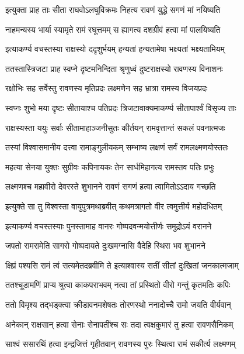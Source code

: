 \twolineshloka
{इत्युक्ता प्राह ताः सीता राघवोऽलघुविक्रमः}
{निहत्य रावणं युद्धे सगणं मां नयिष्यति} %

\twolineshloka
{नाहमन्यस्य भार्या स्यामृते रामं रघूत्तमम्}
{स ह्यागत्य दशग्रीवं हत्वा मां पालयिष्यति} %

\twolineshloka
{इत्याकर्ण्य वचस्तस्या राक्षस्यो ददृशुर्भयम्}
{हन्यतां हन्यतामेषा भक्ष्यतां भक्ष्यतामियम्} %

\twolineshloka
{ततस्तास्त्रिजटा प्राह स्वप्ने दृष्टमनिन्दिता}
{श्रृणुध्वं दुष्टराक्षस्यो रावणस्य विनाशनः} %

\twolineshloka
{रक्षोभिः सह सर्वेस्तु रावणस्य मृतिप्रदः}
{लक्ष्मणेन सह भ्रात्रा रामस्य विजयप्रदः} %

\twolineshloka
{स्वप्नः शुभो मया दृष्टः सीतायाश्च पतिप्रदः}
{त्रिजटावाक्यमाकर्ण्य सीतापार्श्वं विसृज्य ताः} %

\twolineshloka
{राक्षस्यस्ता ययुः सर्वाः सीतामाहाञ्जनीसुतः}
{कीर्तयन् रामवृत्तान्तं सकलं पवनात्मजः} %

\twolineshloka
{तस्यां विश्वासमानीय दत्त्वा रामाङ्गुलीयकम्}
{सम्भाष्य लक्षणं सर्वं रामलक्ष्मणयोस्ततः} %

\twolineshloka
{महत्या सेनया युक्तः सुग्रीवः कपिनायकः}
{तेन सार्धमिहागत्य रामस्तव पतिः प्रभुः} %

\twolineshloka
{लक्ष्मणश्च महावीरो देवरस्ते शुभानने}
{रावणं सगणं हत्वा त्वामितोऽऽदाय गच्छति} %

\twolineshloka
{इत्युक्ते सा तु विश्वस्ता वायुपुत्रमथाब्रवीत्}
{कथमत्रागतो वीर त्वमुत्तीर्य महोदधितम्} %

\twolineshloka
{इत्याकर्ण्य वचस्तस्याः पुनस्तामाह वानरः}
{गोष्पदवन्मयोत्तीर्णः समुद्रोऽयं वरानने} %

\twolineshloka
{जपतो रामरामेति सागरो गोष्पदायते}
{दुःखमग्नासि वैदेहि स्थिरा भव शुभानने} %

\twolineshloka
{क्षिप्रं पश्यसि रामं त्वं सत्यमेतदब्रवीमि ते}
{इत्याश्वास्य सतीं सीतां दुःखितां जनकात्मजाम्} %

\twolineshloka
{ततश्चूडामणिं प्राप्य श्रुत्वा काकपराभवम्}
{नत्वा तां प्रस्थितो वीरो गन्तुं कृतमतिः कपिः} %

\twolineshloka
{ततो विमृश्य तद्भड्क्त्वा क्रीडावनमशेषतः}
{तोरणस्थो ननादोच्चै रामो जयति वीर्यवान्} %

\twolineshloka
{अनेकान् राक्षसान् हत्वा सेनाः सेनापतींश्च सः}
{तदा त्वक्षकुमारं तु हत्वा रावणसैनिकम्} %

\twolineshloka
{साश्वं ससारथिं हत्वा इन्द्रजित्तं गृहीतवान्}
{रावणस्य पुरः स्थित्वा रामं सकीर्त्य लक्ष्मणम्} %

